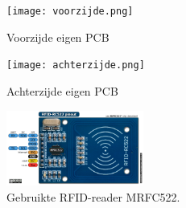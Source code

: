 \begin{figure}[h]
\centering
\texttt{[image: voorzijde.png]}
\caption{Voorzijde eigen PCB}
\label{fig:voorzijde}
\end{figure}

\begin{figure}[h]
\centering
\texttt{[image: achterzijde.png]}
\caption{Achterzijde eigen PCB}
\label{fig:achterzijde}
\end{figure}

\begin{figure}[h]
\centering
\includegraphics[width=0.4\textwidth]{MRFC522.png}
\caption{Gebruikte RFID-reader MRFC522. \label{fig:MRFC522}}
\label{fig:ACEquiv}
\end{figure}




